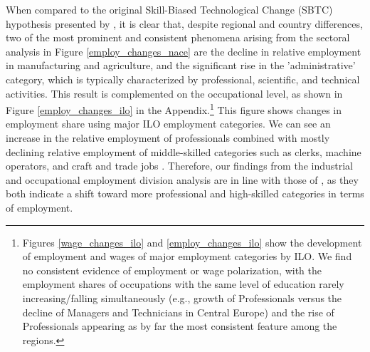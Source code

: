 \documentclass[11pt]{article}
\begin{document}


When compared to the original Skill-Biased Technological Change (SBTC) hypothesis presented by \cite{katz1992changes}, it is clear that, despite regional and country differences, two of the most prominent and consistent phenomena arising from the sectoral analysis in Figure \ref{employ_changes_nace} are the decline in relative employment in manufacturing and agriculture, and the significant rise in the 'administrative' category, which is typically characterized by professional, scientific, and technical activities. This result is complemented on the occupational level, as shown in Figure \ref{employ_changes_ilo} in the Appendix.\footnote{Figures \ref{wage_changes_ilo} and \ref{employ_changes_ilo} show the development of employment and wages of major employment categories by ILO. We find no consistent evidence of employment or wage polarization, with the employment shares of occupations with the same level of education rarely increasing/falling simultaneously (e.g., growth of Professionals versus the decline of Managers and Technicians in Central Europe) and the rise of Professionals appearing as by far the most consistent feature among the regions.} This figure shows changes in employment share using major ILO employment categories. We can see an increase in the relative employment of professionals combined with mostly declining relative employment of middle-skilled categories such as clerks, machine operators, and craft and trade jobs \citep{acemoglu2011skills}. Therefore, our findings from the industrial and occupational employment division analysis are in line with those of \cite{katz1992changes}, as they both indicate a shift toward more professional and high-skilled categories in terms of employment.
\end{document}
